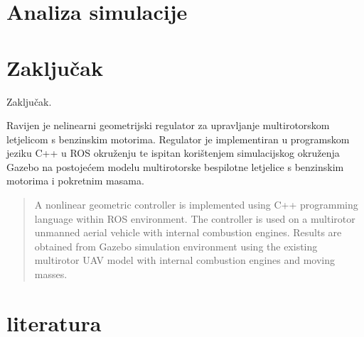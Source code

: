 \documentclass[times, utf8, diplomski]{fer}
\begin{document}
\chapter{Analiza simulacije}
\chapter{Zaključak}
Zaključak.




\begin{sazetak}
Ravijen je nelinearni geometrijski regulator za upravljanje multirotorskom letjelicom s benzinskim motorima. Regulator je implementiran u programskom jeziku C++ u ROS okruženju te ispitan korištenjem simulacijskog okruženja Gazebo na postojećem modelu multirotorske bespilotne letjelice s benzinskim motorima i pokretnim masama.

\end{sazetak}

\begin{abstract}
A nonlinear geometric controller is implemented using C++ programming language within ROS environment. The controller is used on a multirotor unmanned aerial vehicle with internal combustion engines. Results are obtained from Gazebo simulation environment using the existing multirotor UAV model with internal combustion engines and moving masses.

\end{abstract}

\chapter{literatura}
\end{document}
